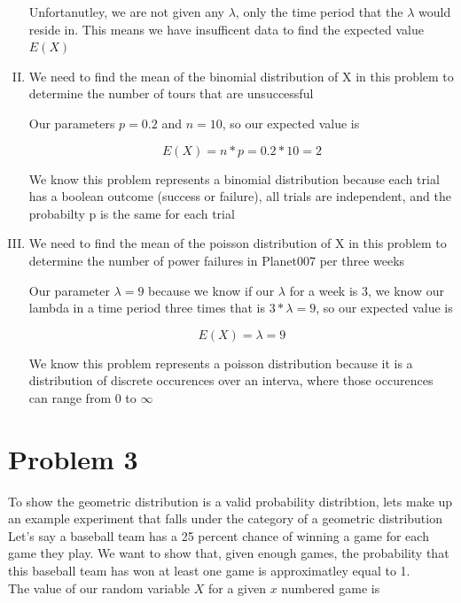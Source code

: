 \documentclass[14pt]{article}
\begin{document}
\begin{enumerate}[I.]
Unfortanutley, we are not given any $\lambda$, only the time period that the $\lambda$ would reside in. This means we have insufficent data to find the expected value $E(X)$ \\

\item
We need to find the mean of the binomial distribution of X in this problem to determine the number of tours that are unsuccessful

Our parameters $p = 0.2$ and $n = 10$, so our expected value is

\[ E(X) = n*p = 0.2 * 10 = 2  \]

We know this problem represents a binomial distribution because each trial has a boolean outcome (success or failure), all trials are independent, and the probabilty p is the same for each trial \\

\item
We need to find the mean of the poisson distribution of X in this problem to determine the number of power failures in Planet007 per three weeks

Our parameter $\lambda = 9$ because we know if our $\lambda$ for a week is 3, we know our lambda in a time period three times that is $3 * \lambda = 9$, so our expected value is

\[ E(X) = \lambda = 9 \]

We know this problem represents a poisson distribution because it is a distribution of discrete occurences over an interva, where those occurences can range from 0 to $\infty$ \pagebreak

\end{enumerate}

\section*{Problem 3}
\noindent To show the geometric distribution is a valid probability distribtion, lets make up an example experiment that falls under the category of a geometric distribution \\

\noindent Let's say a baseball team has a 25 percent chance of winning a game for each game they play. We want to show that, given enough games, the probability that this baseball team has won at least one game is approximatley equal to 1.  \\

\noindent The value of our random variable $X$ for a given $x$ numbered game is 
\end{document}
